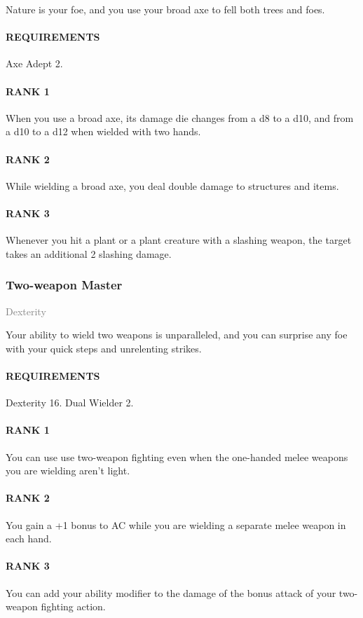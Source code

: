 \normalsize
Nature is your foe, and you use your broad axe to fell both trees and foes.
\paragraph{REQUIREMENTS} Axe Adept 2.
\paragraph{RANK 1} When you use a broad axe, its damage die changes from a d8 to a d10, and from a d10 to a d12 when wielded with two hands.
\paragraph{RANK 2} While wielding a broad axe, you deal double damage to structures and items.
\paragraph{RANK 3} Whenever you hit a plant or a plant creature with a slashing weapon, the target takes an additional 2 slashing damage.

\subsubsection{Two-weapon Master} \label{feat::twoweaponmaster}
\small{\textcolor{gray}{Dexterity}}

\normalsize
Your ability to wield two weapons is unparalleled, and you can surprise any foe with your quick steps and unrelenting strikes.
\paragraph{REQUIREMENTS} Dexterity 16. Dual Wielder 2.
\paragraph{RANK 1} You can use use two-weapon fighting even when the one-handed melee weapons you are wielding aren't light.
\paragraph{RANK 2} You gain a +1 bonus to AC while you are wielding a separate melee weapon in each hand.
\paragraph{RANK 3} You can add your ability modifier to the damage of the bonus attack of your two-weapon fighting action.

